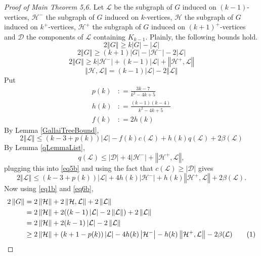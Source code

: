 \documentclass[10pt]{article}
\theoremstyle{plain}
\theoremstyle{definition}
\theoremstyle{remark}
\newcommand{\fancy}[1]{\mathcal{#1}}
\newcommand{\D}{\fancy{D}}
\renewcommand{\L}{\fancy{L}}
\newcommand{\HH}{\fancy{H}}
\newcommand{\card}[1]{\left|#1\right|}
\newcommand{\size}[1]{\left\Vert#1\right\Vert}
\newcommand{\parens}[1]{\left( #1 \right)}
\newcommand{\DefinedAs}{\mathrel{\mathop:}=}
\def\D{\fancy{D}}
\newcommand\numberthis{\addtocounter{equation}{1}\tag{\theequation}}
\begin{document}
\bigskip
\begin{proof}[Proof of Main Theorem 5,6]
Let $\L$ be the subgraph of $G$ induced on $(k-1)$-vertices, $\HH^-$ the subgraph of $G$ induced on $k$-vertices, $\HH$ the subgraph of $G$ induced on $k^+$-vertices, $\HH^+$ the subgraph of $G$ induced on $(k+1)^+$-vertices and $\D$ the components of $\L$ containing $K_{k-1}$.
Plainly, the following bounds hold.
\begin{equation}\label{eq1b}
2\size{G} \ge k\card{G} - \card{\L}
\end{equation}
\begin{equation}\label{eq2b}
2\size{G} \ge (k+1)\card{G} - \card{\HH^-} - 2\card{\L}
\end{equation}
\begin{equation}\label{eq3b}
2\size{G} \ge k\card{\HH^-} + (k-1)\card{\L} + \size{\HH^+, \L}
\end{equation}
\begin{equation}\label{eq4b}
\size{\HH,\L} = (k-1)\card{\L} - 2\size{\L}
\end{equation}
Put
\begin{align*}
p(k) &\DefinedAs \frac{3k-7}{k^2-4k+5}\\
h(k) &\DefinedAs \frac{(k-1)(k-4)}{k^2-4k+5}\\
f(k) &\DefinedAs 2h(k)
\end{align*}
By Lemma \ref{GallaiTreeBound},
\begin{equation}\label{eq5b}
2\size{\L} \le \parens{k-3 + p(k)}\card{\L} - f(k)c(\L) + h(k)q(\L) + 2\beta(\L)
\end{equation}
By Lemma \ref{qLemmaList},
\[q(\L) \le \card{\D} + 4\card{\HH^-} + \size{\HH^+, \L},\]
plugging this into \eqref{eq5b} and using the fact that $c(\L) \ge \card{\D}$ gives
\begin{equation}\label{eq6b}
2\size{\L} \le \parens{k-3 + p(k)}\card{\L} + 4h(k)\card{\HH^-} + h(k)\size{\HH^+, \L} + 2\beta(\L).
\end{equation}
Now using \eqref{eq1b} and \eqref{eq6b},
\begin{align*}
	2\size{G} &= 2\size{\HH} + 2\size{\HH, \L} + 2\size{\L}\\
	&= 2\size{\HH} + 2((k-1)\card{\L} - 2\size{\L}) + 2\size{\L}\\
	&= 2\size{\HH} + 2(k-1)\card{\L} - 2\size{\L}\\
	&\ge 2\size{\HH} + \parens{k+1 - p(k)}\card{\L} - 4h(k)\card{\HH^-} - h(k)\size{\HH^+, \L} - 2\beta(\L)\numberthis \label{eq7b}\\
\end{align*}

\end{proof}
\end{document}

